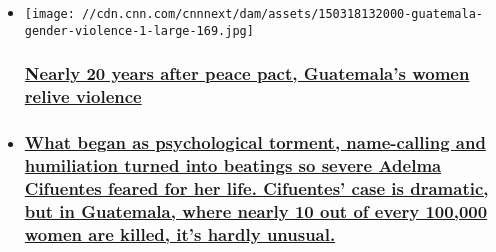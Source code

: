\begin{itemize}
\item
  \href{/2015/04/02/world/iyw-guatemala-gender-violence/index.html}{}

  \texttt{[image: //cdn.cnn.com/cnnnext/dam/assets/150318132000-guatemala-gender-violence-1-large-169.jpg]}

  \hypertarget{nearly-20-years-after-peace-pact-guatemalas-women-relive-violence}{%
  \subsubsection{\texorpdfstring{\href{/2015/04/02/world/iyw-guatemala-gender-violence/index.html}{Nearly
  20 years after peace pact, Guatemala's women relive
  violence}}{Nearly 20 years after peace pact, Guatemala's women relive violence}}\label{nearly-20-years-after-peace-pact-guatemalas-women-relive-violence}}
\item
  \hypertarget{what-began-as-psychological-torment-name-calling-and-humiliation-turned-into-beatings-so-severe-adelma-cifuentes-feared-for-her-life-cifuentes-case-is-dramatic-but-in-guatemala-where-nearly-10-out-of-every-100000-women-are-killed-its-hardly-unusual}{%
  \subsubsection{\texorpdfstring{\href{http://www.preview.cnn.com/2015/04/02/world/iyw-guatemala-gender-violence/index.html}{What
  began as psychological torment, name-calling and humiliation turned
  into beatings so severe Adelma Cifuentes feared for her life.
  Cifuentes' case is dramatic, but in Guatemala, where nearly 10 out of
  every 100,000 women are killed, it's hardly
  unusual.}}{What began as psychological torment, name-calling and humiliation turned into beatings so severe Adelma Cifuentes feared for her life. Cifuentes' case is dramatic, but in Guatemala, where nearly 10 out of every 100,000 women are killed, it's hardly unusual.}}\label{what-began-as-psychological-torment-name-calling-and-humiliation-turned-into-beatings-so-severe-adelma-cifuentes-feared-for-her-life-cifuentes-case-is-dramatic-but-in-guatemala-where-nearly-10-out-of-every-100000-women-are-killed-its-hardly-unusual}}
\end{itemize}

